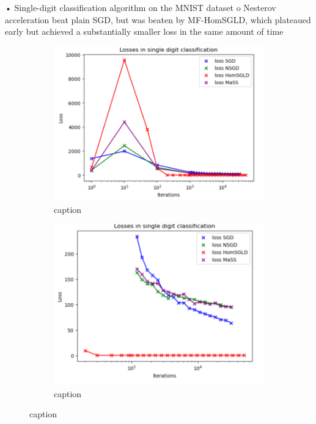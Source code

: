 \documentclass{article}
\begin{document}
•	Single-digit classification algorithm on the MNIST dataset
o	Nesterov acceleration beat plain SGD, but was beaten by MF-HomSGLD, which plateaued early but achieved a substantially smaller loss in the same amount of time
     \begin{figure}[H]
 \begin{subfigure}{0.5\textwidth}
   \centering
   \includegraphics[width=0.8\linewidth]{images/Spiliopoulos2019-SGD-algos-single-digit classification.png}
   \caption{ caption}
   \label{fig: description}
 \end{subfigure}%
 \begin{subfigure}{0.5\textwidth}
   \centering
   \includegraphics[width=0.8\linewidth]{images/Spiliopoulos2019-SGD-algos-single-digit-late-time.png}
   \caption{ caption}
   \label{fig:  description}
 \end{subfigure}
 \caption{ caption}
 \label{fig:  label}
 \end{figure} 
\end{document}
